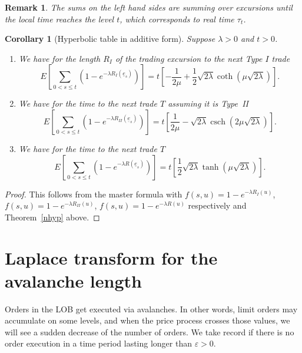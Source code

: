 \documentclass[11pt]{scrartcl}
\newtheorem{corollary}[theorem]{Corollary}
\newtheorem{remark}[theorem]{Remark}
\DeclareMathOperator{\csch}{csch}
\begin{document}
\begin{remark}
The sums on the left hand sides are summing over excursions until the local time reaches the level $t$, which corresponds to real time $\tau _{t}$.
\end{remark}

\begin{corollary}[Hyperbolic table in additive form]
Suppose $\lambda>0$ and $t>0$.

\begin{enumerate}
\item We have for the length $R_{I}$ of the trading excursion to the next
Type $I$ trade 
\begin{equation}
E\left[ \sum_{0<s\leq t}\left( 1-e^{-\lambda R_{I}(\underline{e}_{s})}\right) \right] =t\left[ -\frac{1}{2\mu }+\frac{1}{2}\sqrt{2\lambda }\coth (\mu \sqrt{2\lambda })\right].
\end{equation}

\item We have for the time to the next trade $T$ assuming it is Type~{II} 
\begin{equation}
E\left[ \sum_{0<s\leq t}\left( 1-e^{-\lambda R_{II}(\underline{e}
_{s})}\right) \right] =t\left[ \frac{1}{2\mu }-\sqrt{2\lambda }\csch(2\mu 
\sqrt{2\lambda })\right] .
\end{equation}

\item We have for the time to the next trade $T$ 
\begin{equation}
E\left[ \sum_{0<s\leq t}\left( 1-e^{-\lambda R(\underline{e}_{s})}\right) 
\right] =t\left[ \frac{1}{2}\sqrt{2\lambda }\tanh (\mu \sqrt{2\lambda })
\right] .
\end{equation}
\end{enumerate}
\end{corollary}

\begin{proof}
This follows from the master formula \cite[XII.1.10]{RY} with 
$f(s,u)=1-e^{-\lambda R_{I}(u)}$, 
$f(s,u)=1-e^{-\lambda R_{II}(u)}$, 
$f(s,u)=1-e^{-\lambda R(u)}$ 
respectively and Theorem~\ref{nhyp} above.
\end{proof}

\section{Laplace transform for the avalanche length}

\label{subsec:notwo}

Orders in the LOB get executed via avalanches. In other words, limit orders
may accumulate on some levels, and when the price process crosses those
values, we will see a sudden decrease of the number of orders. We take
record if there is no order execution in a time period lasting longer than $\varepsilon >0$.
\end{document}
